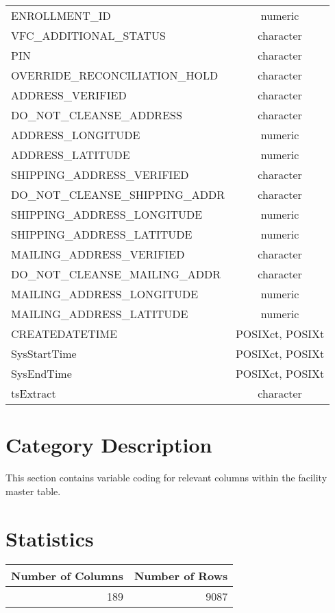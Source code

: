 \documentclass[
  letterpaper,
  DIV=11,
  numbers=noendperiod]{scrreprt}
\begin{document}
\begin{longtable}{lc}
ENROLLMENT\_ID & numeric \\ 
VFC\_ADDITIONAL\_STATUS & character \\ 
PIN & character \\ 
OVERRIDE\_RECONCILIATION\_HOLD & character \\ 
ADDRESS\_VERIFIED & character \\ 
DO\_NOT\_CLEANSE\_ADDRESS & character \\ 
ADDRESS\_LONGITUDE & numeric \\ 
ADDRESS\_LATITUDE & numeric \\ 
SHIPPING\_ADDRESS\_VERIFIED & character \\ 
DO\_NOT\_CLEANSE\_SHIPPING\_ADDR & character \\ 
SHIPPING\_ADDRESS\_LONGITUDE & numeric \\ 
SHIPPING\_ADDRESS\_LATITUDE & numeric \\ 
MAILING\_ADDRESS\_VERIFIED & character \\ 
DO\_NOT\_CLEANSE\_MAILING\_ADDR & character \\ 
MAILING\_ADDRESS\_LONGITUDE & numeric \\ 
MAILING\_ADDRESS\_LATITUDE & numeric \\ 
CREATEDATETIME & POSIXct, POSIXt \\ 
SysStartTime & POSIXct, POSIXt \\ 
SysEndTime & POSIXct, POSIXt \\ 
tsExtract & character \\ 
\bottomrule
\end{longtable}

\hypertarget{category-description-10}{%
\section*{Category Description}\label{category-description-10}}

This section contains variable coding for relevant columns within the
facility master table.

\hypertarget{statistics-10}{%
\section*{Statistics}\label{statistics-10}}

\begin{longtable}{rr}
\toprule
Number of Columns & Number of Rows \\ 
\midrule
189 & 9087 \\ 
\bottomrule
\end{longtable}
\end{document}
